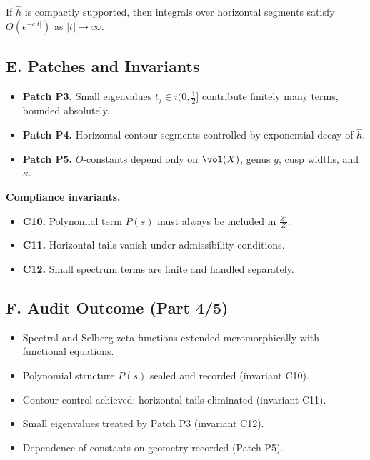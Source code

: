 \begin{lemma}
\label{lem:horizontal-tails}
If $\widehat h$ is compactly supported, then integrals over horizontal segments satisfy $O(e^{-c|t|})$ as $|t|\to\infty$. 
\end{lemma}

\subsection*{E. Patches and Invariants}
\label{subsec:patches}

\begin{itemize}
  \item \textbf{Patch P3.} Small eigenvalues $t_j\in i(0,\tfrac12]$ contribute finitely many terms, bounded absolutely.
  \item \textbf{Patch P4.} Horizontal contour segments controlled by exponential decay of $\widehat h$.
  \item \textbf{Patch P5.} $O$-constants depend only on $\vol(X)$, genus $g$, cusp widths, and $\kappa$.
\end{itemize}

\noindent\textbf{Compliance invariants.}
\begin{itemize}
  \item \textbf{C10.} Polynomial term $P(s)$ must always be included in $\tfrac{Z'}{Z}$.
  \item \textbf{C11.} Horizontal tails vanish under admissibility conditions.
  \item \textbf{C12.} Small spectrum terms are finite and handled separately.
\end{itemize}

\subsection*{F. Audit Outcome (Part 4/5)}
\label{subsec:audit-outcome-part4}

\begin{tcolorbox}[colback=gray!3,colframe=gray!65,title=Audit outcome — Part 4/5]
\begin{itemize}
  \item Spectral and Selberg zeta functions extended meromorphically with functional equations.
  \item Polynomial structure $P(s)$ sealed and recorded (invariant C10).
  \item Contour control achieved: horizontal tails eliminated (invariant C11).
  \item Small eigenvalues treated by Patch P3 (invariant C12).
  \item Dependence of constants on geometry recorded (Patch P5).
\end{itemize}
\end{tcolorbox}


